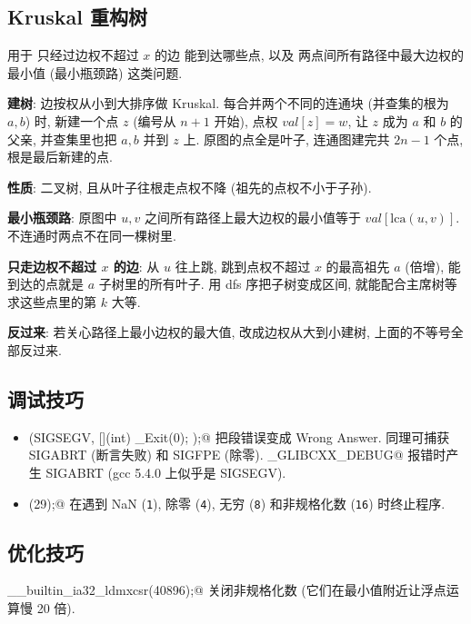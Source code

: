 \subsection{Kruskal 重构树}
用于 只经过边权不超过 $x$ 的边 能到达哪些点, 以及 两点间所有路径中最大边权的最小值 (最小瓶颈路) 这类问题.
\begin{compactitem}
\item \textbf{建树}: 边按权从小到大排序做 Kruskal. 每合并两个不同的连通块 (并查集的根为 $a, b$) 时, 新建一个点 $z$ (编号从 $n+1$ 开始), 点权 $\mathit{val}[z]=w$, 让 $z$ 成为 $a$ 和 $b$ 的父亲, 并查集里也把 $a, b$ 并到 $z$ 上. 原图的点全是叶子, 连通图建完共 $2n-1$ 个点, 根是最后新建的点.
\item \textbf{性质}: 二叉树, 且从叶子往根走点权不降 (祖先的点权不小于子孙).
\item \textbf{最小瓶颈路}: 原图中 $u, v$ 之间所有路径上最大边权的最小值等于 $\mathit{val}[\mathrm{lca}(u,v)]$. 不连通时两点不在同一棵树里.
\item \textbf{只走边权不超过 $x$ 的边}: 从 $u$ 往上跳, 跳到点权不超过 $x$ 的最高祖先 $a$ (倍增), 能到达的点就是 $a$ 子树里的所有叶子. 用 dfs 序把子树变成区间, 就能配合主席树等求这些点里的第 $k$ 大等.
\item \textbf{反过来}: 若关心路径上最小边权的最大值, 改成边权从大到小建树, 上面的不等号全部反过来.
\end{compactitem}

\subsection{调试技巧}
	\begin{itemize}
		\item \verb@signal(SIGSEGV, [](int) { _Exit(0); });@ 把段错误变成 Wrong Answer.
			同理可捕获 SIGABRT (断言失败) 和 SIGFPE (除零).
			\verb@_GLIBCXX_DEBUG@ 报错时产生 SIGABRT (gcc 5.4.0 上似乎是 SIGSEGV).
		\item \verb@feenableexcept(29);@ 在遇到 NaN (\texttt 1), 除零 (\texttt 4), 无穷 (\texttt 8) 和非规格化数 (\texttt{16}) 时终止程序.
	\end{itemize}

\subsection{优化技巧}
	\verb@__builtin_ia32_ldmxcsr(40896);@ 关闭非规格化数 (它们在最小值附近让浮点运算慢 20 倍).
